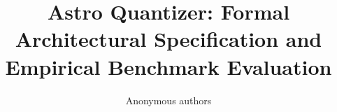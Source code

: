\title{\textbf{Astro Quantizer: Formal Architectural Specification and Empirical Benchmark Evaluation}}

\author{Anonymous authors}
